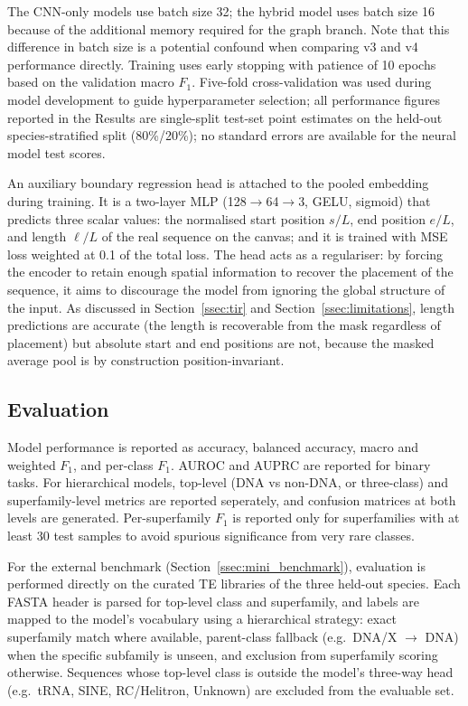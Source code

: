 \documentclass[12pt]{article}
\begin{document}
The CNN-only models use batch size 32; the hybrid model uses batch size 16 because of the additional memory required for the graph branch. Note that this difference in batch size is a potential confound when comparing v3 and v4 performance directly. Training uses early stopping with patience of 10 epochs based on the validation macro $F_1$. Five-fold cross-validation was used during model development to guide hyperparameter selection; all performance figures reported in the Results are single-split test-set point estimates on the held-out species-stratified split (80\%/20\%); no standard errors are available for the neural model test scores.

An auxiliary boundary regression head is attached to the pooled embedding during training. It is a two-layer MLP (128$\to$64$\to$3, GELU, sigmoid) that predicts three scalar values: the normalised start position $s/L$, end position $e/L$, and length $\ell/L$ of the real sequence on the canvas; and it is trained with MSE loss weighted at 0.1 of the total loss. The head acts as a regulariser: by forcing the encoder to retain enough spatial information to recover the placement of the sequence, it aims to discourage the model from ignoring the global structure of the input. As discussed in Section~\ref{ssec:tir} and Section~\ref{ssec:limitations}, length predictions are accurate (the length is recoverable from the mask regardless of placement) but absolute start and end positions are not, because the masked average pool is by construction position-invariant. 

\subsection{Evaluation}\label{ssec:evaluation}

Model performance is reported as accuracy, balanced accuracy, macro and weighted $F_1$, and per-class $F_1$. AUROC and AUPRC are reported for binary tasks. For hierarchical models,  top-level (DNA vs non-DNA, or three-class) and superfamily-level metrics are reported seperately, and confusion matrices at both levels are generated. Per-superfamily $F_1$ is reported only for superfamilies with at least 30 test samples to avoid spurious significance from very rare classes. 

For the external benchmark (Section~\ref{ssec:mini_benchmark}), evaluation is performed directly on the curated TE libraries of the three held-out species. Each FASTA header is parsed for top-level class and superfamily, and labels are mapped to the model's vocabulary using a hierarchical strategy: exact superfamily match where available, parent-class fallback (e.g.\ DNA/X $\to$ DNA) when the specific subfamily is unseen, and exclusion from superfamily scoring otherwise. Sequences whose top-level class is outside the model's three-way head (e.g.\ tRNA, SINE, RC/Helitron, Unknown) are excluded from the evaluable set.
\end{document}
